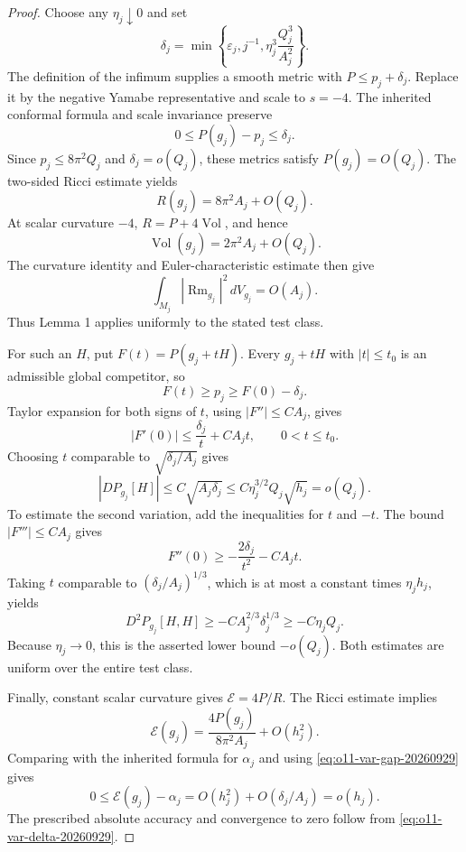 \documentclass[11pt]{article}
\begin{document}
\begin{proof}
Choose any $\eta_j\downarrow0$ and set
\begin{equation}
 \delta_j=\min\left\{
       \varepsilon_j,j^{-1},\eta_j^3\frac{Q_j^3}{A_j^2}
                    \right\}.
 \label{eq:o11-var-delta-20260929}
\end{equation}
The definition of the infimum supplies a smooth metric with $P\le
p_j+\delta_j$. Replace it by the negative Yamabe representative and
scale to $s=-4$. The inherited conformal formula and scale invariance
preserve
\begin{equation}
             0\le P(g_j)-p_j\le\delta_j.
 \label{eq:o11-var-gap-20260929}
\end{equation}
Since $p_j\le8\pi^2Q_j$ and $\delta_j=o(Q_j)$, these metrics satisfy
$P(g_j)=O(Q_j)$. The two-sided Ricci estimate yields
\[
 R(g_j)=8\pi^2A_j+O(Q_j).
\]
At scalar curvature $-4$, $R=P+4\operatorname{Vol}$, and hence
\[
 \operatorname{Vol}(g_j)=2\pi^2A_j+O(Q_j).
\]
The curvature identity and Euler-characteristic estimate then give
\[
 \int_{M_j}|\operatorname{Rm}_{g_j}|^2\,dV_{g_j}=O(A_j).
\]
Thus Lemma 1 applies uniformly to the stated test class.

For such an $H$, put $F(t)=P(g_j+tH)$. Every $g_j+tH$ with
$|t|\le t_0$ is an admissible global competitor, so
\[
                  F(t)\ge p_j\ge F(0)-\delta_j.
\]
Taylor expansion for both signs of $t$, using $|F''|\le CA_j$, gives
\[
 |F'(0)|\le\frac{\delta_j}{t}+CA_jt,
 \qquad 0<t\le t_0.
\]
Choosing $t$ comparable to $\sqrt{\delta_j/A_j}$ gives
\begin{equation}
 |DP_{g_j}[H]|\le C\sqrt{A_j\delta_j}
       \le C\eta_j^{3/2}Q_j\sqrt{h_j}=o(Q_j).
 \label{eq:o11-var-first-20260929}
\end{equation}
To estimate the second variation, add the inequalities for $t$ and $-t$.
The bound $|F'''|\le CA_j$ gives
\[
 F''(0)\ge-\frac{2\delta_j}{t^2}-CA_jt.
\]
Taking $t$ comparable to $(\delta_j/A_j)^{1/3}$, which is at most a
constant times $\eta_jh_j$, yields
\begin{equation}
 D^2P_{g_j}[H,H]\ge-CA_j^{2/3}\delta_j^{1/3}
                        \ge-C\eta_jQ_j.
 \label{eq:o11-var-second-20260929}
\end{equation}
Because $\eta_j\to0$, this is the asserted lower bound $-o(Q_j)$.
Both estimates are uniform over the entire test class.

Finally, constant scalar curvature gives $\mathcal E=4P/R$. The Ricci
estimate implies
\[
 \mathcal E(g_j)=\frac{4P(g_j)}{8\pi^2A_j}+O(h_j^2).
\]
Comparing with the inherited formula for $\alpha_j$ and using
\eqref{eq:o11-var-gap-20260929} gives
\[
 0\le\mathcal E(g_j)-\alpha_j
       =O(h_j^2)+O(\delta_j/A_j)=o(h_j).
\]
The prescribed absolute accuracy and convergence to zero follow from
\eqref{eq:o11-var-delta-20260929}.
\end{proof}
\end{document}
